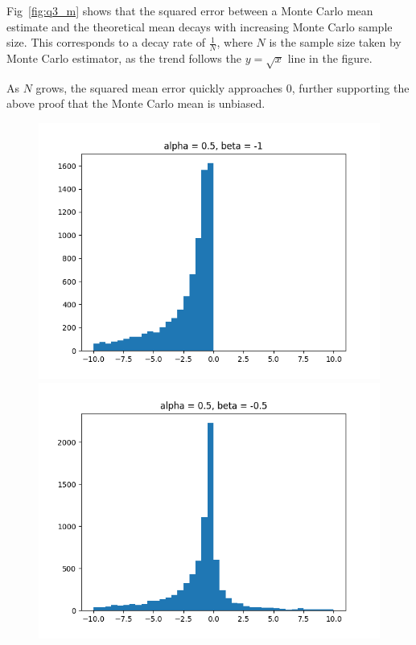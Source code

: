 \documentclass[11pt, twocolumn]{article}
\begin{document}
Fig~\ref{fig:q3_m} shows that the squared error between a Monte Carlo mean estimate and the theoretical mean decays with increasing Monte Carlo sample size. 
This corresponds to a decay rate of $\frac{1}{N}$, where $N$ is the sample size taken by Monte Carlo estimator, as the trend follows the $y=\sqrt{x}$ line in the figure.


As $N$ grows, the squared mean error quickly approaches 0, further supporting the above proof that the Monte Carlo mean is unbiased.

\vspace{-0.5em}
\begin{figure}[h]
    \centering
    \begin{minipage}{0.2\textwidth}
        \centering
        \includegraphics[width=\textwidth]{q4_1_a0.5_bn1}
    \end{minipage}%
    \begin{minipage}{0.2\textwidth}
        \centering
        \includegraphics[width=\textwidth]{q4_1_a0.5_bn0.5}

\end{minipage}
\end{figure}
\end{document}

